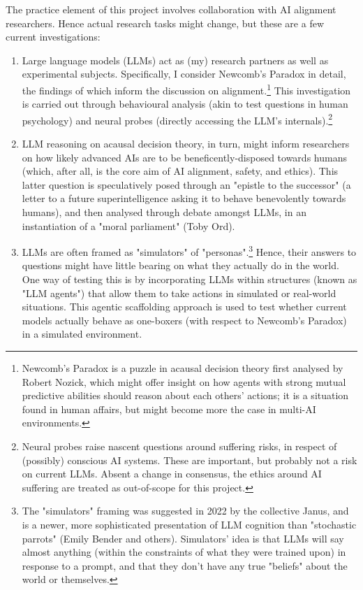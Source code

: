 \begin{abstractspacing}
\begin{enumerate}
\end{enumerate}

The practice element of this project involves collaboration with AI alignment researchers. Hence actual research tasks might change, but these are a few current investigations:

\begin{enumerate}
    \item Large language models (LLMs) act as (my) research partners as well as experimental subjects. Specifically, I consider Newcomb's Paradox in detail, the findings of which inform the discussion on alignment.\footnote{Newcomb's Paradox is a puzzle in acausal decision theory first analysed by Robert Nozick, which might offer insight on how agents with strong mutual predictive abilities should reason about each others' actions; it is a situation found in human affairs, but might become more the case in multi-AI environments.} This investigation is carried out through behavioural analysis (akin to test questions in human psychology) and neural probes (directly accessing the LLM's internals).\footnote{Neural probes raise nascent questions around suffering risks, in respect of (possibly) conscious AI systems. These are important, but probably not a risk on current LLMs. Absent a change in consensus, the ethics around AI suffering are treated as out-of-scope for this project.}
    
    \item LLM reasoning on acausal decision theory, in turn, might inform researchers on how likely advanced AIs are to be beneficently-disposed towards humans (which, after all, is the core aim of AI alignment, safety, and ethics). This latter question is speculatively posed through an "epistle to the successor" (a letter to a future superintelligence asking it to behave benevolently towards humans), and then analysed through debate amongst LLMs, in an instantiation of a "moral parliament" (Toby Ord).
    
    \item LLMs are often framed as "simulators" of "personas".\footnote{The "simulators" framing was suggested in 2022 by the collective Janus, and is a newer, more sophisticated presentation of LLM cognition than "stochastic parrots" (Emily Bender and others). Simulators' idea is that LLMs will say almost anything (within the constraints of what they were trained upon) in response to a prompt, and that they don't have any true "beliefs" about the world or themselves.} Hence, their answers to questions might have little bearing on what they actually do in the world. One way of testing this is by incorporating LLMs within structures (known as "LLM agents") that allow them to take actions in simulated or real-world situations. This agentic scaffolding approach is used to test whether current models actually behave as one-boxers (with respect to Newcomb's Paradox) in a simulated environment.


\end{enumerate}
\end{abstractspacing}
